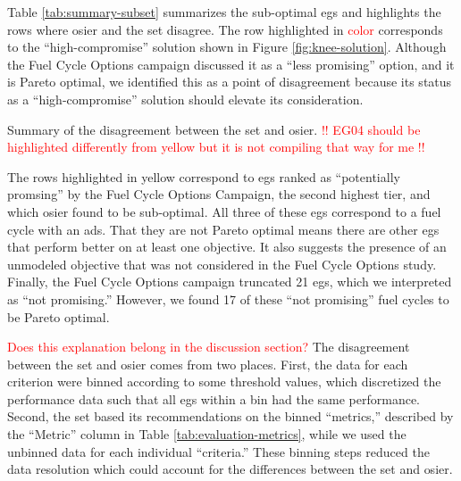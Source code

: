 Table \ref{tab:summary-subset} summarizes the sub-optimal \glspl{eg}
and highlights the rows where \gls{osier} and the \gls{set} disagree.
The row highlighted in \textcolor{red}{color} corresponds to the ``high-compromise''
solution shown in Figure \ref{fig:knee-solution}. Although the Fuel Cycle Options campaign
discussed it as a ``less promising'' option, and it is Pareto optimal, we identified this
as a point of disagreement because its status as a ``high-compromise'' solution 
should elevate its consideration.

\begin{table}[ht!]
    \centering
    \caption{Summary of the disagreement between the \gls{set} and \gls{osier}.
    \textcolor{red}{!! EG04 should be highlighted differently from yellow but it
    is not compiling that way for me !!}}
    \label{tab:summary-subset}
    \resizebox{\columnwidth}{!}{}
\end{table}

The rows highlighted in yellow correspond to \glspl{eg} ranked as ``potentially
promsing'' by the Fuel Cycle Options Campaign, the second highest tier, and which
\gls{osier} found to be sub-optimal. All three of these \glspl{eg} correspond to 
a fuel cycle with an \gls{ads}. That they are not Pareto optimal means there are 
other \glspl{eg} that perform better on at least one objective. It also suggests 
the presence of an unmodeled objective that was not considered in the Fuel Cycle
Options study. Finally, the Fuel Cycle Options campaign truncated 21 \glspl{eg},
which we interpreted as ``not promising.'' However, we found 17 of these ``not promising''
fuel cycles to be Pareto optimal.

\textcolor{red}{Does this explanation belong in the discussion section?}
The disagreement between the \gls{set} and \gls{osier} comes from two places. First,
the data for each criterion were binned according to some threshold values, which discretized
the performance data such that all \glspl{eg} within a bin had the same performance.
Second, 
the \gls{set} based its recommendations on the binned ``metrics,'' described by the 
``Metric'' column in Table \ref{tab:evaluation-metrics}, while we used the unbinned
data for each individual ``criteria.'' These binning steps reduced the data resolution which
could account for the differences between the \gls{set} and \gls{osier}.

